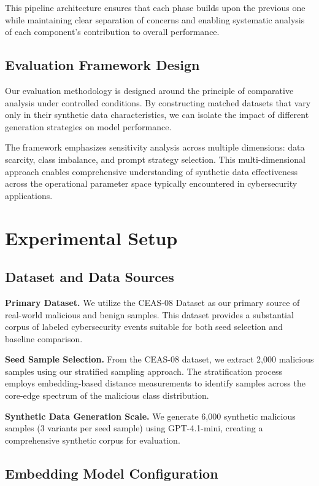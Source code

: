 This pipeline architecture ensures that each phase builds upon the previous one while maintaining clear separation of concerns and enabling systematic analysis of each component's contribution to overall performance.

\subsection{Evaluation Framework Design}

Our evaluation methodology is designed around the principle of comparative analysis under controlled conditions. By constructing matched datasets that vary only in their synthetic data characteristics, we can isolate the impact of different generation strategies on model performance.

The framework emphasizes sensitivity analysis across multiple dimensions: data scarcity, class imbalance, and prompt strategy selection. This multi-dimensional approach enables comprehensive understanding of synthetic data effectiveness across the operational parameter space typically encountered in cybersecurity applications.

\section{Experimental Setup}

\subsection{Dataset and Data Sources}

\textbf{Primary Dataset.} We utilize the CEAS-08 Dataset as our primary source of real-world malicious and benign samples. This dataset provides a substantial corpus of labeled cybersecurity events suitable for both seed selection and baseline comparison.

\textbf{Seed Sample Selection.} From the CEAS-08 dataset, we extract 2,000 malicious samples using our stratified sampling approach. The stratification process employs embedding-based distance measurements to identify samples across the core-edge spectrum of the malicious class distribution.

\textbf{Synthetic Data Generation Scale.} We generate 6,000 synthetic malicious samples (3 variants per seed sample) using GPT-4.1-mini, creating a comprehensive synthetic corpus for evaluation.

\subsection{Embedding Model Configuration}

